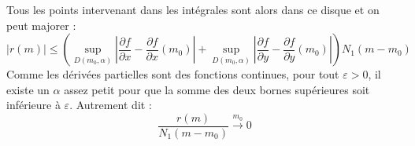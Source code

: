 \begin{demo}
Tous les points intervenant dans les intégrales sont alors dans ce disque et on peut majorer :
\begin{displaymath}
 |r(m)|\leq
\left(
\sup_{D(m_0,\alpha)}\left\vert\dfrac{\partial f}{\partial x}-\dfrac{\partial f}{\partial x}(m_0) \right\vert
+
\sup_{D(m_0,\alpha)}\left\vert\dfrac{\partial f}{\partial y}-\dfrac{\partial f}{\partial y}(m_0) \right\vert
\right)N_1(m-m_0)
\end{displaymath}
Comme les dérivées partielles sont des fonctions continues, pour tout $\varepsilon>0$, il existe un $\alpha$ assez petit pour que la somme des deux bornes supérieures soit inférieure à $\varepsilon$. Autrement dit :
\begin{displaymath}
 \frac{r(m)}{N_1(m-m_0)} \xrightarrow{m_0} 0
\end{displaymath}
\end{demo}


